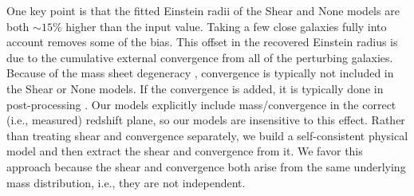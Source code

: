 One key point is that the fitted Einstein radii of the Shear and None models are both $\sim 15\%$ higher than the input value. Taking a few close galaxies fully into account removes some of the bias. This offset in the recovered Einstein radius is due to the cumulative external convergence from all of the perturbing galaxies. Because of the mass sheet degeneracy \citep{Falco85}, convergence is typically not included in the Shear or None models. If the convergence is added, it is typically done in post-processing \citep{Collett13, Suyu10}. Our models explicitly include mass/convergence in the correct (i.e., measured) redshift plane, so our models are insensitive to this effect. Rather than treating shear and convergence separately, we build a self-consistent physical model and then extract the shear and convergence from it. We favor this approach because the shear and convergence both arise from the same underlying mass distribution, i.e., they are not independent.